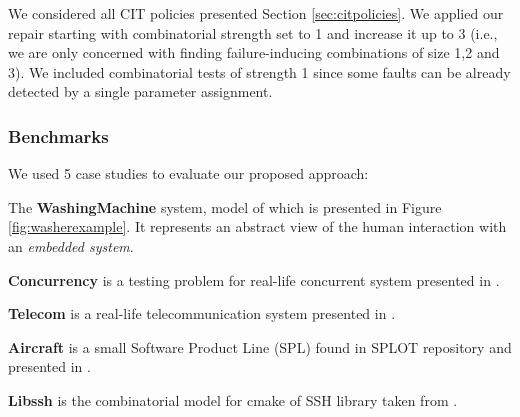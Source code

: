 \begin{tikzborder}{\cite{Gargantini16:validation}}
\begin{tikzborder}{\cite{gargantini_combinatorial_2017}}
\begin{tikzborder}{\cite{gargantini_combinatorial_2017}}
We considered all CIT policies presented Section \ref{sec:citpolicies}. We applied our repair starting with combinatorial strength set to 1 and increase it up to 3 (i.e., we are only concerned with finding failure-inducing combinations of size 1,2 and 3). We included combinatorial tests of strength 1 since some faults can be already detected by a single parameter assignment.
\be

\subsubsection{Benchmarks}

\bb We used 5 case studies to evaluate our proposed approach:

\begin{asparaenum}
	
	\item The \textbf{WashingMachine} system, model of which is presented in Figure \ref{fig:washerexample}. It represents an abstract view of the human interaction with an \emph{embedded system}.  
	
	\item \textbf{Concurrency} is a testing problem for real-life concurrent system presented in \cite{segall_using_2011}.
	
	\item \textbf{Telecom} is a real-life telecommunication system presented in \cite{segall_using_2011}.
	
	\item \textbf{Aircraft} is a small Software Product Line (SPL) found in SPLOT repository and presented in \cite{Voelter:2009}.
	
	\item \textbf{Libssh} is the combinatorial model for cmake of SSH library taken from \cite{icst2016}.
		
\end{asparaenum}
\be


\end{tikzborder}
\end{tikzborder}
\end{tikzborder}
